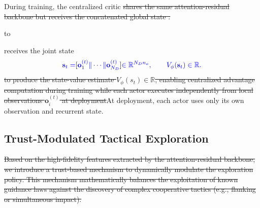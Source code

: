 \documentclass[lettersize,journal]{IEEEtran}
\providecommand{\DIFadd}[1]{{\protect\color{blue}#1}} %
\providecommand{\DIFdel}[1]{{\protect\color{red}\sout{#1}}}                      %
\newcommand{\DIFdelDISPLAY}[1]{%
  \par\addvspace{4pt}%
  \sbox{\DIFDELbox}{$\displaystyle\color{red}\begin{aligned}#1\end{aligned}$}%
  \noindent\hbox to\hsize{\hfil %
    \rlap{\usebox{\DIFDELbox}}%
    \raisebox{\dimexpr(\ht\DIFDELbox-\dp\DIFDELbox)/2\relax}[0pt][0pt]{\textcolor{red}{\rule{\wd\DIFDELbox}{0.6pt}}}%
    \hfil}%
  \par\addvspace{4pt}%
} %
\providecommand{\DIFaddbegin}{} %
\providecommand{\DIFaddend}{} %
\providecommand{\DIFdelbegin}{} %
\providecommand{\DIFdelend}{} %
\newcommand{\DIFscaledelfig}{0.5}
\newlength{\DIFdelgraphicswidth} %
\newlength{\DIFdelgraphicsheight} %
\newcommand{\DIFaddincludegraphics}[2][]{{\color{blue}\fbox{\DIFOincludegraphics[#1]{#2}}}} %
\newcommand{\DIFdelincludegraphics}[2][]{%
\sbox{\DIFdelgraphicsbox}{\DIFOincludegraphics[#1]{#2}}%
\settoboxwidth{\DIFdelgraphicswidth}{\DIFdelgraphicsbox} %
\settoboxtotalheight{\DIFdelgraphicsheight}{\DIFdelgraphicsbox} %
\scalebox{\DIFscaledelfig}{%
\parbox[b]{\DIFdelgraphicswidth}{\usebox{\DIFdelgraphicsbox}\\[-\baselineskip] \rule{\DIFdelgraphicswidth}{0em}}\llap{\resizebox{\DIFdelgraphicswidth}{\DIFdelgraphicsheight}{%
\setlength{\unitlength}{\DIFdelgraphicswidth}%
\begin{picture}(1,1)%
\thicklines\linethickness{2pt} %
{\color[rgb]{1,0,0}\put(0,0){\framebox(1,1){}}}%
{\color[rgb]{1,0,0}\put(0,0){\line( 1,1){1}}}%
{\color[rgb]{1,0,0}\put(0,1){\line(1,-1){1}}}%
\end{picture}%
}\hspace*{3pt}}} %
} %
\DeclareRobustCommand{\DIFaddbegin}{\DIFOaddbegin \let\includegraphics\DIFaddincludegraphics} %
\DeclareRobustCommand{\DIFaddend}{\DIFOaddend \let\includegraphics\DIFOincludegraphics} %
\DeclareRobustCommand{\DIFdelbegin}{\DIFOdelbegin \let\includegraphics\DIFdelincludegraphics} %
\DeclareRobustCommand{\DIFdelend}{\DIFOaddend \let\includegraphics\DIFOincludegraphics} %
\begin{document}
\DIFadd{During training}\DIFaddend , the centralized critic \DIFdelbegin \DIFdel{shares the same attention-residual backbone but receives the concatenated global state
:
}\DIFdelDISPLAY{%
s_t = \left[\mathbf{o}_1^{(t)} \| \mathbf{o}_2^{(t)} \| \cdots \| \mathbf{o}_N^{(t)}\right] \in \mathbb{R}^{N \cdot n_o}
}
\DIFdelend \DIFaddbegin \DIFadd{receives the joint state
}\begin{equation}
\DIFadd{\label{eq:critic_state}
\mathbf s_t=}[\DIFadd{\mathbf o_1^{(t)}\|\cdots\|\mathbf o_{N_D}^{(t)}}]
\DIFadd{\in\mathbb R^{N_Dn_o},\qquad V_{\phi}(\mathbf s_t)\in\mathbb R.
}\end{equation}\DIFaddend 
\DIFdelbegin \DIFdel{to produce the state-value estimate $V_\phi(s_t) \in \mathbb{R}$, enabling centralized advantage computation during training while each actor executes independently from local observations $\mathbf{o}_i^{(t)}$ at deployment}\DIFdelend \DIFaddbegin \DIFadd{At deployment, each actor uses only its own observation and recurrent state}\DIFaddend .

\subsection{Trust-Modulated Tactical Exploration}
\label{subsec:trust_exploration}

\DIFdelbegin \DIFdel{Based on the high-fidelity features extracted by the attention-residual backbone, we introduce a trust-based mechanism to dynamically modulate the exploration policy. This mechanism mathematically balances the exploitation of known guidance laws against the discovery of complex cooperative tactics (e.g., flanking or simultaneous impact). }%
\end{document}
